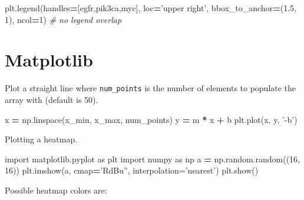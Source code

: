 \documentclass[]{book}
\newenvironment{Shaded}{\begin{snugshade}}{\end{snugshade}}
\newcommand{\CommentTok}[1]{\textcolor[rgb]{0.56,0.35,0.01}{\textit{#1}}}
\newcommand{\DecValTok}[1]{\textcolor[rgb]{0.00,0.00,0.81}{#1}}
\newcommand{\FloatTok}[1]{\textcolor[rgb]{0.00,0.00,0.81}{#1}}
\newcommand{\ImportTok}[1]{#1}
\newcommand{\NormalTok}[1]{#1}
\newcommand{\OperatorTok}[1]{\textcolor[rgb]{0.81,0.36,0.00}{\textbf{#1}}}
\newcommand{\StringTok}[1]{\textcolor[rgb]{0.31,0.60,0.02}{#1}}
\begin{document}
\begin{Shaded}
\begin{Highlighting}[]
\NormalTok{plt.legend(handles}\OperatorTok{=}\NormalTok{[egfr,pik3ca,myc],}
\NormalTok{           loc}\OperatorTok{=}\StringTok{'upper right'}\NormalTok{, bbox_to_anchor}\OperatorTok{=}\NormalTok{(}\FloatTok{1.5}\NormalTok{, }\DecValTok{1}\NormalTok{),}
\NormalTok{           ncol}\OperatorTok{=}\DecValTok{1}\NormalTok{) }\CommentTok{# no legend overlap}
\end{Highlighting}
\end{Shaded}

\hypertarget{matplotlib}{%
\section{Matplotlib}\label{matplotlib}}

Plot a straight line where \texttt{num\_points} is the number of elements to populate the array with (default is 50).

\begin{Shaded}
\begin{Highlighting}[]
\NormalTok{x }\OperatorTok{=}\NormalTok{ np.linspace(x_min, x_max, num_points)}
\NormalTok{y }\OperatorTok{=}\NormalTok{ m }\OperatorTok{*}\NormalTok{ x }\OperatorTok{+}\NormalTok{ b}
\NormalTok{plt.plot(x, y, }\StringTok{'-b'}\NormalTok{)}
\end{Highlighting}
\end{Shaded}

Plotting a heatmap.

\begin{Shaded}
\begin{Highlighting}[]
\ImportTok{import}\NormalTok{ matplotlib.pyplot }\ImportTok{as}\NormalTok{ plt}
\ImportTok{import}\NormalTok{ numpy }\ImportTok{as}\NormalTok{ np}
\NormalTok{a }\OperatorTok{=}\NormalTok{ np.random.random((}\DecValTok{16}\NormalTok{, }\DecValTok{16}\NormalTok{))}
\NormalTok{plt.imshow(a, cmap}\OperatorTok{=}\StringTok{'RdBu'', interpolation='}\NormalTok{nearest}\StringTok{')}
\StringTok{plt.show()}
\end{Highlighting}
\end{Shaded}

Possible heatmap colors are:
\end{document}
